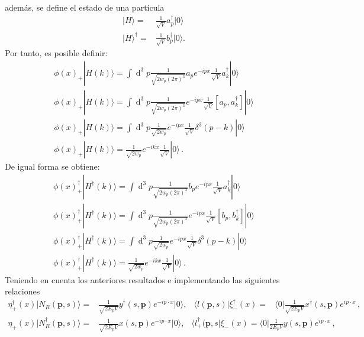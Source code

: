 además, se define el estado de una partícula
\begin{align}
|H\rangle=&\frac{1}{\sqrt{V}}a_p^{\dagger}|0\rangle\nonumber\\
|H\rangle^\dagger=&\frac{1}{\sqrt{V}}b_p^{\dagger}|0\rangle .
\end{align}
Por tanto, es posible definir:
\begin{align}
\phi(x)_+|H(k)\rangle=\int\operatorname{d}^3p\frac{1}{\sqrt{2w_{p}(2\pi)^{3}}}a_pe^{-ipx}\frac{1}{\sqrt{V}}a_k^{\dagger}|0\rangle\\
\label{p2}
\phi(x)_+|H(k)\rangle=\int\operatorname{d}^3p\frac{1}{\sqrt{2w_{p}(2\pi)^{3}}}e^{-ipx}\frac{1}{\sqrt{V}}[a_p,a_k^{\dagger}]|0\rangle\\
\label{3}
\phi(x)_+|H(k)\rangle=\int\operatorname{d}^3p\frac{1}{\sqrt{2w_p}}e^{-ipx}\frac{1}{\sqrt{V}}\delta^{3}(p-k)|0\rangle\\
\label{4}
\phi(x)_+|H(k)\rangle=\frac{1}{\sqrt{2w_{p}{}}}e^{-ikx}\frac{1}{\sqrt{V}}|0\rangle\,.
\end{align}
De igual forma se obtiene:
\begin{align}
\phi(x)^{\dagger}_+|H^\dagger(k)\rangle=\int\operatorname{d}^3p\frac{1}{\sqrt{2w_{p}(2\pi)^{3}}}b_pe^{-ipx}\frac{1}{\sqrt{V}}a_k^{\dagger}|0\rangle\\
\phi(x)^{\dagger}_+|H^\dagger(k)\rangle=\int\operatorname{d}^3p\frac{1}{\sqrt{2w_{p}(2\pi)^{3}}}e^{-ipx}\frac{1}{\sqrt{V}}[b_p,b_k^{\dagger}]|0\rangle\\
\phi(x)^{\dagger}_+|H^\dagger(k)\rangle=\int\operatorname{d}^3p\frac{1}{\sqrt{2w_p}}e^{-ipx}\frac{1}{\sqrt{V}}\delta^{3}(p-k)|0\rangle\\
\phi(x)^{\dagger}_+|H^\dagger(k)\rangle=\frac{1}{\sqrt{2w_{p}{}}}e^{-ikx}\frac{1}{\sqrt{V}}|0\rangle\,.
\end{align}
Teniendo en cuenta los anteriores resultados e implementando las siguientes relaciones
\begin{align}
  \eta_+^{\dagger}(x)|N_R (\boldsymbol{p},s)\rangle=&\frac{1}{\sqrt{2 E_{p} V}}y^{\dagger}(s,\mathbf{p})e^{-i p\cdot x}|0\rangle,&\langle l(\boldsymbol{p},s)|\xi_-^{\dagger}(x)=&\langle 0|\frac{1}{\sqrt{2 E_p V}}x^{\dagger}(s,\mathbf{p})e^{i p\cdot x}\,,
\end{align}
\begin{align}
\eta_+(x)|N_R ^\dagger(\boldsymbol{p},s)\rangle=&\frac{1}{\sqrt{2 E_{p} V}}x(s,\mathbf{p})e^{-i p\cdot x}|0\rangle,&\langle l_+^\dagger(\boldsymbol{p},s|\xi_-(x)=\langle 0|\frac{1}{2E_p V}y(s,\mathbf{p})e^{i p\cdot x}\,,
\end{align}
